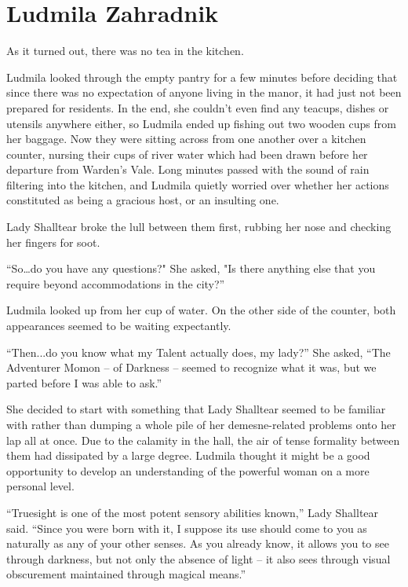 \chapter{Ludmila Zahradnik}

As it turned out, there was no tea in the kitchen.

 

Ludmila looked through the empty pantry for a few minutes before deciding that since there was no expectation of anyone living in the manor, it had just not been prepared for residents. In the end, she couldn’t even find any teacups, dishes or utensils anywhere either, so Ludmila ended up fishing out two wooden cups from her baggage. Now they were sitting across from one another over a kitchen counter, nursing their cups of river water which had been drawn before her departure from Warden’s Vale. Long minutes passed with the sound of rain filtering into the kitchen, and Ludmila quietly worried over whether her actions constituted as being a gracious host, or an insulting one.

 

Lady Shalltear broke the lull between them first, rubbing her nose and checking her fingers for soot.

 

“So…do you have any questions?" She asked, "Is there anything else that you require beyond accommodations in the city?”

 

Ludmila looked up from her cup of water. On the other side of the counter, both appearances seemed to be waiting expectantly.

 

“Then...do you know what my Talent actually does, my lady?” She asked, “The Adventurer Momon – of Darkness – seemed to recognize what it was, but we parted before I was able to ask.”

 

She decided to start with something that Lady Shalltear seemed to be familiar with rather than dumping a whole pile of her demesne-related problems onto her lap all at once. Due to the calamity in the hall, the air of tense formality between them had dissipated by a large degree. Ludmila thought it might be a good opportunity to develop an understanding of the powerful woman on a more personal level.

 

“Truesight is one of the most potent sensory abilities known,” Lady Shalltear said. “Since you were born with it, I suppose its use should come to you as naturally as any of your other senses. As you already know, it allows you to see through darkness, but not only the absence of light – it also sees through visual obscurement maintained through magical means.”

